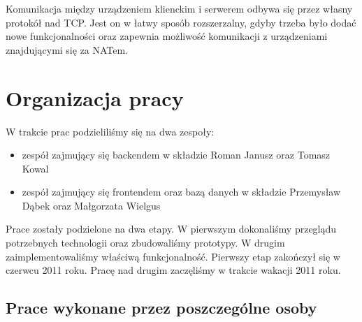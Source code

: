 \documentclass[polish,12pt]{aghthesis}
\begin{document}
Komunikacja między urządzeniem klienckim i serwerem odbywa się przez własny protokół nad TCP. Jest on w łatwy sposób rozszerzalny, gdyby trzeba było dodać nowe funkcjonalności oraz zapewnia możliwość komunikacji z urządzeniami znajdującymi się za NATem.

\section{Organizacja pracy}

W trakcie prac podzieliliśmy się na dwa zespoły:
\begin{itemize}
\item zespół zajmujący się backendem w składzie Roman Janusz oraz Tomasz Kowal
\item zespół zajmujący się frontendem oraz bazą danych w składzie Przemysław Dąbek oraz Małgorzata Wielgus
\end{itemize}

Prace zostały podzielone na dwa etapy. W pierwszym dokonaliśmy przeglądu potrzebnych technologii oraz zbudowaliśmy prototypy. W drugim zaimplementowaliśmy właściwą funkcjonalność.
Pierwszy etap zakończył się w czerwcu 2011 roku. Pracę nad drugim zaczęliśmy w trakcie wakacji 2011 roku.

\subsection*{Prace wykonane przez poszczególne osoby}
\end{document}
